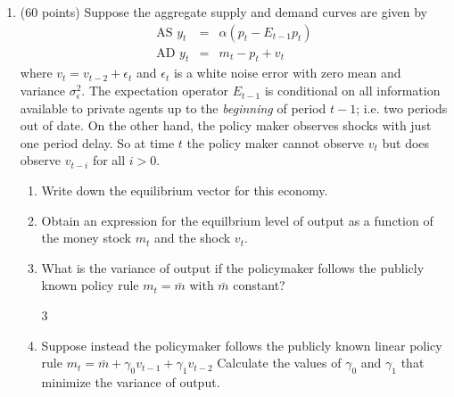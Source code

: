 \documentclass[12pt,a4paper]{article}
\begin{document}
\begin{enumerate}
\item  (60 points) Suppose the aggregate supply and demand curves are given by 
\begin{eqnarray*}
\text{AS }y_{t} &=&\alpha \left( p_{t}-E_{t-1}p_{t}\right)  \\
\text{AD }y_{t} &=&m_{t}-p_{t}+v_{t}
\end{eqnarray*}
where $v_{t}=v_{t-2}+\epsilon_{t}$ and $\epsilon_{t}$ is a white noise
error with zero mean and variance $\sigma _{\epsilon}^{2}.$ The
expectation operator $E_{t-1}$ is conditional on all information
available to private agents up to the \emph{beginning} of period
$t-1$; i.e. two periods out of date.  On the other hand, the policy
maker observes shocks with just one period delay.  So at time $t$ the
policy maker cannot observe $v_{t}$ but does observe $v_{t-i}$ for all $i>0.$
\begin{enumerate}
\item Write down the equilibrium vector for this economy.
\item Obtain an expression for the equilbrium level of output as a
  function of the money stock $m_{t}$ and the shock $v_{t}.$
\item  What is the variance of output if the policymaker follows the
publicly known policy rule $m_{t}=\bar{m}$ with $\bar{m}$ constant?

\newpage
\begin{center}
\vspace*{-.8in}
\hspace*{-1cm}  3
\end{center}

\item Suppose instead the policymaker follows the publicly known
  linear policy rule $m_{t}=\bar{m}+\gamma_{0} v_{t-1}
  +\gamma_{1}v_{t-2}$ Calculate the values of $\gamma_{0} $ and
  $\gamma_{1}$ that minimize the variance of output.
\end{enumerate}


\end{enumerate}
\end{document}
